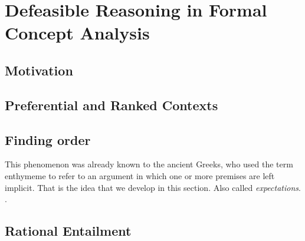 \chapter{Defeasible Reasoning in Formal Concept Analysis}
\label{chapter:defeasible-reasoning-in-fca}

\section{Motivation}
\clearpage

\section{Preferential and Ranked Contexts}
\clearpage

\section{Finding order}
\clearpage
This phenomenon was already known to the ancient Greeks, who used the term enthymeme to refer to an argument in which one
or more premises are left implicit. That is the idea that we develop in this section. Also called \textit{expectations}.
\cite{makinson2003bridges}.

\section{Rational Entailment}
\clearpage